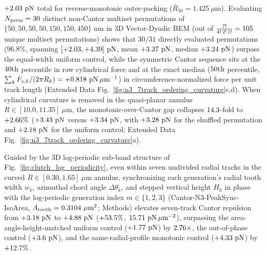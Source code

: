 \documentclass[pdflatex,sn-nature]{sn-jnl}
\DeclareRobustCommand{\roundzero}[1]{\fpeval{round(#1,0)}}
\DeclareRobustCommand{\roundone}[1]{\fpeval{round(#1,1)}}
\DeclareRobustCommand{\roundtwo}[1]{\fpeval{round(#1,2)}}
\DeclareRobustCommand{\roundthree}[1]{\fpeval{round(#1,3)}}
\begin{document}
$+\roundtwo{\NthreeCurvCylRevMonotonicFzPn}\text{ pN}$ total for reverse-monotonic outer-packing ($\bar{R}_{50} = 1.425\ \mu\text{m}$). Evaluating $N_{\rm perm} = \roundzero{\NthreePermNEvaluated}$ distinct non-Cantor multiset permutations of $\{50, 50, 50, 50, 150, 150, 450\}\text{ nm}$ in 3D Vector-Dyadic BEM (out of $\frac{7!}{4!\,2!\,1!} = \roundzero{\NthreePermNUniqueMultiset}$ unique multiset permutations) shows that $30/31$ directly evaluated permutations ($96.8\%$, spanning $[+\roundtwo{\NthreePermFzMinPn}, +\roundtwo{\NthreePermFzMaxPn}]\text{ pN}$, mean $+\roundtwo{\NthreePermFzMeanPn}\text{ pN}$, median $+\roundtwo{\NthreePermFzMedianPn}\text{ pN}$) surpass the equal-width uniform control, while the symmetric Cantor sequence sits at the $\roundzero{\NthreePermCantorPctFzEval}\text{th}$ percentile in raw cylindrical force and at the exact median ($\roundzero{\NthreePermCantorPctFcircEval}\text{th}$ percentile, $\sum_k F_{z,k}/(2\pi R_k) = +\roundthree{\NthreeCurvCylCantorFcircPnPerUm}\text{ pN}\,\mu\text{m}^{-1}$) in circumference-normalized force per unit track length (Extended Data Fig.~\ref{fig:n3_7track_ordering_curvature}c,d). When cylindrical curvature is removed in the quasi-planar annulus $R \in [10.0, 11.35]\ \mu\text{m}$, the monotonic-over-Cantor gap collapses $\roundone{\NthreeCurvGapReductionFactor}$-fold to $+\roundtwo{\NthreeCurvQparcMonoVsCantorPct}\%$ ($+\roundtwo{\NthreeCurvQparcMonotonicFzPn}\text{ pN}$ versus $+\roundtwo{\NthreeCurvQparcCantorFzPn}\text{ pN}$, with $+\roundtwo{\NthreeCurvQparcShuffledFzPn}\text{ pN}$ for the shuffled permutation and $+\roundtwo{\NthreeCurvQparcUniformFzPn}\text{ pN}$ for the uniform control; Extended Data Fig.~\ref{fig:n3_7track_ordering_curvature}a).

Guided by the 3D log-periodic sub-band structure of Fig.~\ref{fig:clutch_log_periodicity}, even within seven undivided radial tracks in the curved $R \in [0.30, 1.65]\ \mu\text{m}$ annulus, synchronizing each generation's radial tooth width $w_k$, azimuthal chord angle $\Delta\theta_k$, and stepped vertical height $H_k$ in phase with the log-periodic generation index $m \in \{1,2,3\}$ (Cantor-N3-PeakSync-IsoArea, $A_{\rm tooth} = 0.3104\ \mu\text{m}^2$; Methods) elevates seven-track Cantor repulsion from $+\roundtwo{\NthreePeaksyncCantorFlatzFzPn}\text{ pN}$ to $+\roundtwo{\NthreePeaksyncCantorIsoareaFzPn}\text{ pN}$ ($+\roundone{\NthreePeaksyncGainIsoVsFlatzPct}\%$, $\roundtwo{\NthreePeaksyncCantorIsoareaFa}\text{ pN}\,\mu\text{m}^{-2}$), surpassing the area-angle-height-matched uniform control ($+\roundtwo{\NthreePeaksyncCtrlUniAahFzPn}\text{ pN}$) by $\roundtwo{\NthreePeaksyncRatioIsoVsUniAah}\times$, the out-of-phase control ($+\roundtwo{\NthreePeaksyncCtrlOutofphaseAahFzPn}\text{ pN}$), and the same-radial-profile monotonic control ($+\roundtwo{\NthreePeaksyncCtrlMonoSameradFzPn}\text{ pN}$) by $+\roundone{\NthreePeaksyncGainIsoVsMonoSameradPct}\%$.
\end{document}
